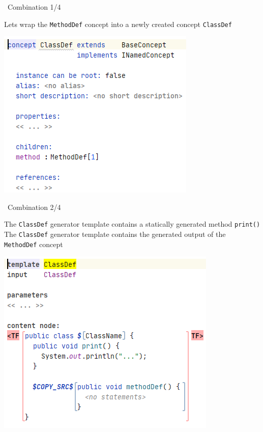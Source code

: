 	\begin{frame}{\workshoptemplate\ Combination 1/4}
	\begin{minipage}{0.52\textwidth}
		Lets wrap the \texttt{MethodDef} concept into a newly created concept  \texttt{ClassDef}
	\end{minipage}
	\begin{minipage}{0.4\textwidth}
		\includegraphics[height=0.8\textheight]{illustrations/classDef.png}
	\end{minipage}
	\end{frame}

	\begin{frame}{\workshoptemplate\ Combination 2/4}
	\begin{minipage}{0.52\textwidth}
		The \texttt{ClassDef} generator template contains a statically generated method \texttt{print()}\\
		
		The \texttt{ClassDef} generator template contains the generated output of the \texttt{MethodDef} concept
	\end{minipage}
	\begin{minipage}{0.4\textwidth}
		\includegraphics[height=0.8\textheight]{illustrations/classDefGen.png}
	\end{minipage}
	\end{frame}

